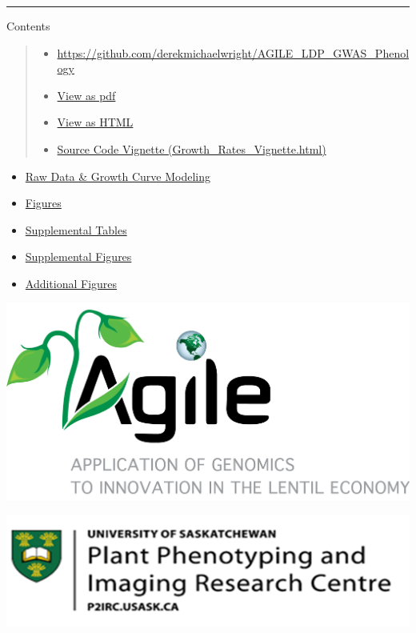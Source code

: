 \documentclass[
]{article}
\providecommand{\tightlist}{%
  \setlength{\itemsep}{0pt}\setlength{\parskip}{0pt}}
\begin{document}
\begin{center}\rule{0.5\linewidth}{0.5pt}\end{center}

Contents

\begin{quote}
\begin{itemize}
\tightlist
\item
  \url{https://github.com/derekmichaelwright/AGILE_LDP_GWAS_Phenology}
\item
  \href{https://github.com/derekmichaelwright/AGILE_LDP_UAV/raw/master/README.pdf}{View
  as pdf}
\item
  \href{https://derekmichaelwright.github.io/AGILE_LDP_UAV/README.html}{View
  as HTML}
\item
  \href{https://derekmichaelwright.github.io/AGILE_LDP_UAV/Growth_Rates_Vignette.html}{Source
  Code Vignette (Growth\_Rates\_Vignette.html)}
\end{itemize}
\end{quote}

\begin{itemize}
\tightlist
\item
  \hyperref[raw-data-ux26-growth-curve-modeling]{Raw Data \& Growth
  Curve Modeling}
\item
  \hyperref[figures]{Figures}
\item
  \hyperref[supplemental-tables]{Supplemental Tables}
\item
  \hyperref[supplemental-figures]{Supplemental Figures}
\item
  \hyperref[additional-figures]{Additional Figures}
\end{itemize}

\includegraphics[width=0.5\linewidth,height=\textheight,keepaspectratio]{Additional/img_Agile.png}

\includegraphics[width=0.5\linewidth,height=\textheight,keepaspectratio]{Additional/img_P2IRC.png}
\end{document}

